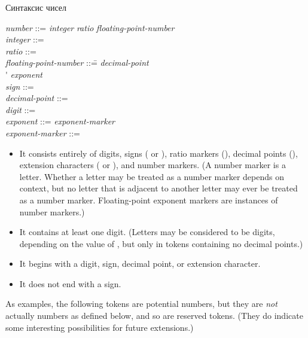 \begin{table}[t]
\caption{Синтаксис чисел}
\label{NUMBER-SYNTAX-TABLE}
\tabbingsep=0pt
\normalsize
\begin{tabbing}
\emph{number} ::= \emph{integer} {\Mor} \emph{ratio} {\Mor} \emph{floating-point-number} \\
\emph{integer} ::=    \\
\emph{ratio} ::=   \cdf{/}  \\
\emph{floating-point-number} ::=\=   \emph{decimal-point}   \\
\>{\Mor} \'   \emph{exponent} \\ \emph{sign} ::= \cdf{+} {\Mor} \cdf{-} \\
\emph{decimal-point} ::=  \\
\emph{digit} ::=  {\Mor}  {\Mor}  {\Mor}  {\Mor} 
         {\Mor}  {\Mor}  {\Mor}  {\Mor}  {\Mor}  \\
\emph{exponent} ::= \emph{exponent-marker}   \\
\emph{exponent-marker} ::=  {\Mor}  {\Mor}  {\Mor}  {\Mor} 
                   {\Mor}  {\Mor}  {\Mor}  {\Mor}  {\Mor} 
\end{tabbing}
\end{table}

\begin{itemize}
\item
It consists entirely of digits, signs (\cdf{+} or \cdf{-}),
ratio markers (\cdf{/}), decimal points (), extension characters
(\cd{{\Xcircumflex}} or \cd{{\Xunderscore}}), and number markers.  (A number marker is
a letter.  Whether a letter may be treated as a number marker depends
on context, but no letter that is adjacent to another letter may ever be
treated as a number marker.  Floating-point exponent markers are instances
of number markers.)

\item
It contains at least one digit.  (Letters may be considered to be
digits, depending on the value of , but only
in tokens containing no decimal points.)

\item
It begins with a digit, sign, decimal point, or extension character.

\item
It does not end with a sign.
\end{itemize}
As examples, the following tokens are potential numbers,
but they are \emph{not} actually numbers as defined below, and so are
reserved tokens.  (They do indicate some interesting possibilities
for future extensions.)

